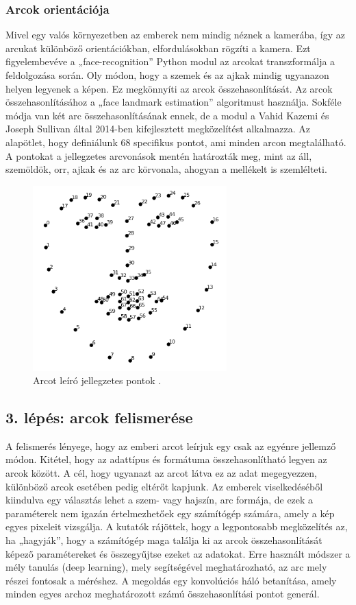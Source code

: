 \subsubsection{Arcok orientációja}
Mivel egy valós környezetben az emberek nem mindig néznek a kamerába, így az arcukat különböző orientációkban, elfordulásokban rögzíti a kamera. Ezt figyelembevéve a „face-recognition” Python modul az arcokat transzformálja a feldolgozása során. Oly módon, hogy a szemek és az ajkak mindig ugyanazon helyen legyenek a képen. Ez megkönnyíti az arcok összehasonlítását.
Az arcok összehasonlításához a „face landmark estimation” algoritmust használja. Sokféle módja van két arc összehasonlításának ennek, de a modul a Vahid Kazemi és Joseph Sullivan által 2014-ben kifejlesztett megközelítést \cite{artc36} alkalmazza.
Az alapötlet, hogy definiálunk 68 specifikus pontot, ami minden arcon megtalálható. A pontokat a jellegzetes arcvonások mentén határozták meg, mint az áll, szemöldök, orr, ajkak és az arc körvonala, ahogyan a mellékelt  is szemlélteti.
\begin{figure}[!ht]
    \centering
    \includegraphics[width=75mm, keepaspectratio]{03_images/arcpontok.png}
    \caption{Arcot leíró jellegzetes pontok \cite{artc_gold}.}
    \label{fig:arcpontok}
\end{figure}

\subsection{3. lépés: arcok felismerése}
A felismerés lényege, hogy az emberi arcot leírjuk egy csak az egyénre jellemző módon. Kitétel, hogy az adattípus és formátuma összehasonlítható legyen az arcok között. A cél, hogy ugyanazt az arcot látva ez az adat megegyezzen, különböző arcok esetében pedig eltérőt kapjunk. Az emberek viselkedéséből kiindulva egy választás lehet a szem- vagy hajszín, arc formája, de ezek a paraméterek nem igazán értelmezhetőek egy számítógép számára, amely a kép egyes pixeleit vizsgálja. A kutatók rájöttek, hogy a legpontosabb megközelítés az, ha „hagyják”, hogy a számítógép maga találja ki az arcok összehasonlítását képező paramétereket és összegyűjtse ezeket az adatokat. Erre használt módszer a mély tanulás (deep learning), mely segítségével meghatározható, az arc mely részei fontosak a méréshez. A megoldás egy konvolúciós háló betanítása, amely minden egyes archoz meghatározott számú összehasonlítási pontot generál.

